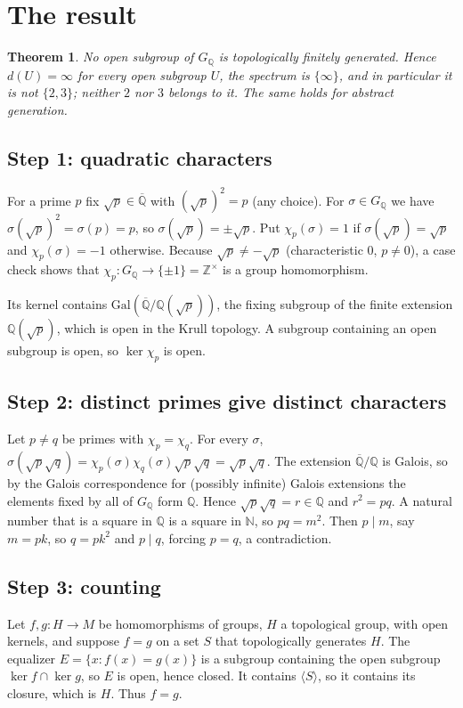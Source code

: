 \documentclass[11pt]{article}
\newtheorem{theorem}{Theorem}
\theoremstyle{definition}
\theoremstyle{remark}
\renewcommand{\_}{\oldus\allowbreak}
\newcommand{\Q}{\mathbb{Q}}
\newcommand{\Qb}{\overline{\mathbb{Q}}}
\newcommand{\GQ}{G_{\mathbb{Q}}}
\begin{document}
\section{The result}

\begin{theorem}\label{thm:main}
No open subgroup of $\GQ$ is topologically finitely generated. Hence $d(U)=\infty$ for every open subgroup $U$,
the spectrum is $\{\infty\}$, and in particular it is not $\{2,3\}$; neither $2$ nor $3$ belongs to it. The same
holds for abstract generation.
\end{theorem}

\subsection*{Step 1: quadratic characters}
For a prime $p$ fix $\sqrt p\in\Qb$ with $(\sqrt p)^2=p$ (any choice). For $\sigma\in\GQ$ we have
$\sigma(\sqrt p)^2=\sigma(p)=p$, so $\sigma(\sqrt p)=\pm\sqrt p$. Put $\chi_p(\sigma)=1$ if
$\sigma(\sqrt p)=\sqrt p$ and $\chi_p(\sigma)=-1$ otherwise. Because $\sqrt p\neq -\sqrt p$ (characteristic $0$,
$p\neq0$), a case check shows that $\chi_p:\GQ\to\{\pm1\}=\mathbb{Z}^\times$ is a group homomorphism.

Its kernel contains $\mathrm{Gal}(\Qb/\Q(\sqrt p))$, the fixing subgroup of the finite extension
$\Q(\sqrt p)$, which is open in the Krull topology. A subgroup containing an open subgroup is open, so
$\ker\chi_p$ is open.

\subsection*{Step 2: distinct primes give distinct characters}
Let $p\neq q$ be primes with $\chi_p=\chi_q$. For every $\sigma$,
$\sigma(\sqrt p\sqrt q)=\chi_p(\sigma)\chi_q(\sigma)\sqrt p\sqrt q=\sqrt p\sqrt q$. The extension $\Qb/\Q$ is
Galois, so by the Galois correspondence for (possibly infinite) Galois extensions the elements fixed by all
of $\GQ$ form $\Q$. Hence $\sqrt p\sqrt q=r\in\Q$ and $r^2=pq$. A natural number that is a square in $\Q$ is a
square in $\mathbb{N}$, so $pq=m^2$. Then $p\mid m$, say $m=pk$, so $q=pk^2$ and $p\mid q$, forcing $p=q$, a
contradiction.

\subsection*{Step 3: counting}
Let $f,g:H\to M$ be homomorphisms of groups, $H$ a topological group, with open kernels, and suppose $f=g$
on a set $S$ that topologically generates $H$. The equalizer $E=\{x: f(x)=g(x)\}$ is a subgroup containing the
open subgroup $\ker f\cap\ker g$, so $E$ is open, hence closed. It contains $\langle S\rangle$, so it contains
its closure, which is $H$. Thus $f=g$.
\end{document}
